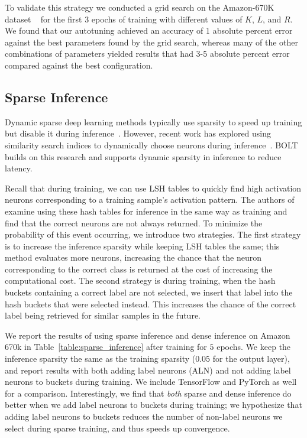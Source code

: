 \documentclass[sigconf]{acmart}
\begin{document}
To validate this strategy we conducted a grid search on the Amazon-670K dataset ~\cite{Bhatia16} for the first 3 epochs of training with different values of $K$, $L$, and $R$. We found that our autotuning achieved an accuracy of 1 absolute percent error against the best parameters found by the grid search, whereas many of the other combinations of parameters yielded results that had 3-5 absolute percent error compared against the best configuration.







\subsection{Sparse Inference}

Dynamic sparse deep learning methods typically use sparsity to speed up training but disable it during inference~\cite{chen2020slide, chen2020mongoose}. However, recent work has explored using similarity search indices to dynamically choose neurons during inference~\cite{liu2020climbing}. BOLT builds on this research and supports dynamic sparsity in inference to reduce latency.

Recall that during training, we can use LSH tables to quickly find high activation neurons corresponding to a training sample's activation pattern. The authors of ~\cite{liu2020climbing} examine using these hash tables for inference in the same way as training and find that the correct neurons are not always returned. To minimize the probability of this event occurring, we introduce two strategies. The first strategy is to increase the inference sparsity while keeping LSH tables the same; this method evaluates more neurons, increasing the chance that the neuron corresponding to the correct class is returned at the cost of increasing the computational cost. The second strategy is during training, when the hash buckets containing a correct label are not selected, we insert that label into the hash buckets that were selected instead. This increases the chance of the correct label being retrieved for similar samples in the future.

We report the results of using sparse inference and dense inference on Amazon 670k in Table~\ref{table:sparse_inference} after training for $5$ epochs. We keep the inference sparsity the same as the training sparsity ($0.05$ for the output layer), and report results with both adding label neurons (ALN) and not adding label neurons to buckets during training. We include TensorFlow and PyTorch as well for a comparison. Interestingly, we find that \textit{both} sparse and dense inference do better when we add label neurons to buckets during training; we hypothesize that adding label neurons to buckets reduces the number of non-label neurons we select during sparse training, and thus speeds up convergence.
\end{document}

